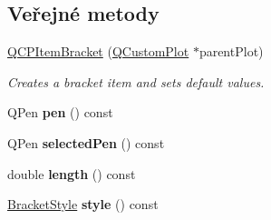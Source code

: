 \subsection*{Veřejné metody}
\begin{DoxyCompactItemize}
\item 
\hyperlink{classQCPItemBracket_a44ecfa37a76de5e3549e2d61f9d8ee56}{Q\+C\+P\+Item\+Bracket} (\hyperlink{classQCustomPlot}{Q\+Custom\+Plot} $\ast$parent\+Plot)
\begin{DoxyCompactList}\small\item\em Creates a bracket item and sets default values. \end{DoxyCompactList}\item 
\hypertarget{classQCPItemBracket_a8963ff4a232b649c83d2461fd3c30d39}{}Q\+Pen {\bfseries pen} () const \label{classQCPItemBracket_a8963ff4a232b649c83d2461fd3c30d39}

\item 
\hypertarget{classQCPItemBracket_a9f6ea5ea9559ef36dfacdadd6e9bdcf0}{}Q\+Pen {\bfseries selected\+Pen} () const \label{classQCPItemBracket_a9f6ea5ea9559ef36dfacdadd6e9bdcf0}

\item 
\hypertarget{classQCPItemBracket_aed5126eafcb1381ee5718499c20ba023}{}double {\bfseries length} () const \label{classQCPItemBracket_aed5126eafcb1381ee5718499c20ba023}

\item 
\hypertarget{classQCPItemBracket_afad726f453f70fe77c0e9c2f260fff97}{}\hyperlink{classQCPItemBracket_a7ac3afd0b24a607054e7212047d59dbd}{Bracket\+Style} {\bfseries style} () const \label{classQCPItemBracket_afad726f453f70fe77c0e9c2f260fff97}


\end{DoxyCompactItemize}
